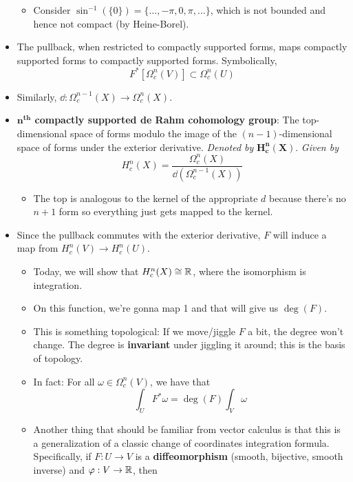 \documentclass[../notes.tex]{subfiles}
\begin{document}
\begin{itemize}
\begin{itemize}
        \item Consider $\sin^{-1}(\{0\})=\{\dots,-\pi,0,\pi,\dots\}$, which is not bounded and hence not compact (by Heine-Borel).
    \end{itemize}
    \item The pullback, when restricted to compactly supported forms, maps compactly supported forms to compactly supported forms. Symbolically,
    \begin{equation*}
        F^*[\Omega_c^n(V)] \subset \Omega_c^n(U)
    \end{equation*}
    \item Similarly, $\dd:\Omega_c^{n-1}(X)\to\Omega_c^n(X)$.
    \item \textbf{$\bm{n}^\textbf{th}$ compactly supported de Rahm cohomology group}: The top-dimensional space of forms modulo the image of the $(n-1)$-dimensional space of forms under the exterior derivative. \emph{Denoted by} $\bm{H_c^n(X)}$. \emph{Given by}
    \begin{equation*}
        H_c^n(X) = \frac{\Omega_c^n(X)}{\dd(\Omega_c^{n-1}(X))}
    \end{equation*}
    \begin{itemize}
        \item The top is analogous to the kernel of the appropriate $d$ because there's no $n+1$ form so everything just gets mapped to the kernel.
    \end{itemize}
    \item Since the pullback commutes with the exterior derivative, $F$ will induce a map from $H_c^n(V)\to H_c^n(U)$.
    \begin{itemize}
        \item Today, we will show that $H_c^n(X)\cong\mathbb{R}$, where the isomorphism is integration.
        \item On this function, we're gonna map 1 and that will give us $\deg(F)$.
        \item This is something topological: If we move/jiggle $F$ a bit, the degree won't change. The degree is \textbf{invariant} under jiggling it around; this is the basis of topology.
        \item In fact: For all $\omega\in\Omega_c^n(V)$, we have that
        \begin{equation*}
            \int_UF^*\omega = \deg(F)\int_V\omega
        \end{equation*}
        \item Another thing that should be familiar from vector calculus is that this is a generalization of a classic change of coordinates integration formula. Specifically, if $F:U\to V$ is a \textbf{diffeomorphism} (smooth, bijective, smooth inverse) and $\varphi:V\to\mathbb{R}$, then

\end{itemize}
\end{itemize}
\end{document}
